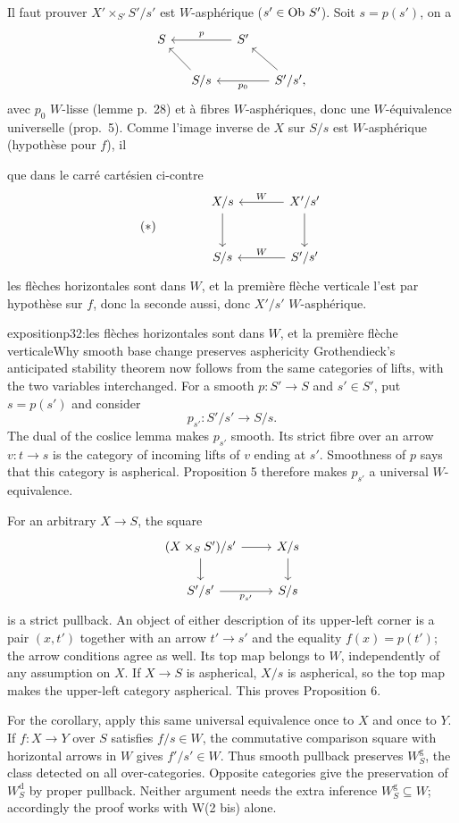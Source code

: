 Il faut prouver $X'\times_{S'}S'/s'$ est $W$-asphérique ($s'\in\operatorname{Ob}\,S'$). Soit $s=p(s')$, on a
\[
\begin{tikzcd}[column sep=small]
S & & S' \arrow[ll, "p"'] & \\
& S/s \arrow[ul] & & S'/s', \arrow[ul] \arrow[ll, "p_0"]
\end{tikzcd}
\]
avec $p_0$ $W$-lisse (lemme p.~28) et à fibres $W$-asphériques, donc une $W$-équivalence universelle (prop.~5). Comme l'image inverse de $X$ sur $S/s$ est $W$-asphérique (hypothèse pour $f$), il

\leavevmode{}que dans le carré cartésien ci-contre
\[
(*)\qquad\qquad
\begin{tikzcd}[row sep=large, column sep=large]
X/s \arrow[d] & X'/s' \arrow[l, "W"'] \arrow[d] \\
S/s & S'/s' \arrow[l, "W"']
\end{tikzcd}
\]
les flèches horizontales sont dans $W$, et la première flèche verticale l'est par hypothèse sur $f$, donc la seconde aussi, donc $X'/s'$ $W$-asphérique.

\begin{dcomment}{exposition}{p32:les flèches horizontales sont dans $W$, et la première flèche verticale}{Why smooth base change preserves asphericity}
Grothendieck's anticipated stability theorem now follows from the same categories of lifts, with the two variables interchanged. For a smooth $p:S'\to S$ and $s'\in S'$, put $s=p(s')$ and consider
\[
 p_{s'}:S'/s'\longrightarrow S/s.
\]
The dual of the coslice lemma makes $p_{s'}$ smooth. Its strict fibre over an arrow $v:t\to s$ is the category of incoming lifts of $v$ ending at $s'$. Smoothness of $p$ says that this category is aspherical. Proposition 5 therefore makes $p_{s'}$ a universal $W$-equivalence.

For an arbitrary $X\to S$, the square
\[
\begin{tikzcd}
 (X\times_S S')/s'\ar[r]\ar[d]&X/s\ar[d]\\
 S'/s'\ar[r,"p_{s'}"']&S/s
\end{tikzcd}
\]
is a strict pullback. An object of either description of its upper-left corner is a pair $(x,t')$ together with an arrow $t'\to s'$ and the equality $f(x)=p(t')$; the arrow conditions agree as well. Its top map belongs to $W$, independently of any assumption on $X$. If $X\to S$ is aspherical, $X/s$ is aspherical, so the top map makes the upper-left category aspherical. This proves Proposition 6.

For the corollary, apply this same universal equivalence once to $X$ and once to $Y$. If $f:X\to Y$ over $S$ satisfies $f/s\in W$, the commutative comparison square with horizontal arrows in $W$ gives $f'/s'\in W$. Thus smooth pullback preserves $W_S^{\mathrm g}$, the class detected on all over-categories. Opposite categories give the preservation of $W_S^{\mathrm d}$ by proper pullback. Neither argument needs the extra inference $W_S^{\mathrm g}\subseteq W$; accordingly the proof works with W(2 bis) alone.
\end{dcomment}


